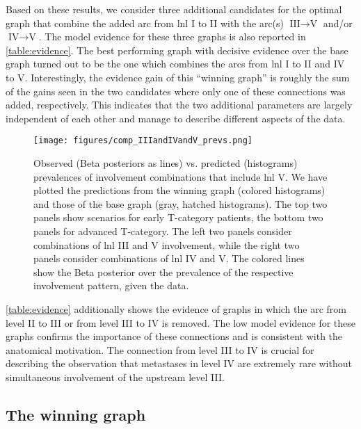 \documentclass[twocolumn]{aastex631}
\begin{document}
Based on these results, we consider three additional candidates for the optimal graph that combine the added arc from \gls{lnl} I to II with the arc(s) $\text{III} \rightarrow \text{V}$ and/or $\text{IV} \rightarrow \text{V}$. The model evidence for these three graphs is also reported in \autoref{table:evidence}. The best performing graph with decisive evidence over the base graph turned out to be the one which combines the arcs from \gls{lnl} I to II and IV to V. Interestingly, the evidence gain of this ``winning graph'' is roughly the sum of the gains seen in the two candidates where only one of these connections was added, respectively. This indicates that the two additional parameters are largely independent of each other and manage to describe different aspects of the data.

\begin{figure*}
    \begin{centering}
        \texttt{[image: figures/comp\_IIIandIVandV\_prevs.png]}
        \caption{Observed (Beta posteriors as lines) vs. predicted (histograms) prevalences of involvement combinations that include \gls{lnl} V. We have plotted the predictions from the winning graph (colored histograms) and those of the base graph (gray, hatched histograms). The top two panels show scenarios for early T-category patients, the bottom two panels for advanced T-category. The left two panels consider combinations of \gls{lnl} III and V involvement, while the right two panels consider combinations of \gls{lnl} IV and V. The colored lines show the Beta posterior over the prevalence of the respective involvement pattern, given the data. \label{fig:IIIandIVandV_prevs}}
    \end{centering}
\end{figure*}

\autoref{table:evidence} additionally shows the evidence of graphs in which the arc from level II to III or from level III to IV is removed. The low model evidence for these graphs confirms the importance of these connections and is consistent with the anatomical motivation. The connection from level III to IV is crucial for describing the observation that metastases in level IV are extremely rare without simultaneous involvement of the upstream level III. 


\subsection{The winning graph}
\label{subsec:results:optimal_graph}
\end{document}
